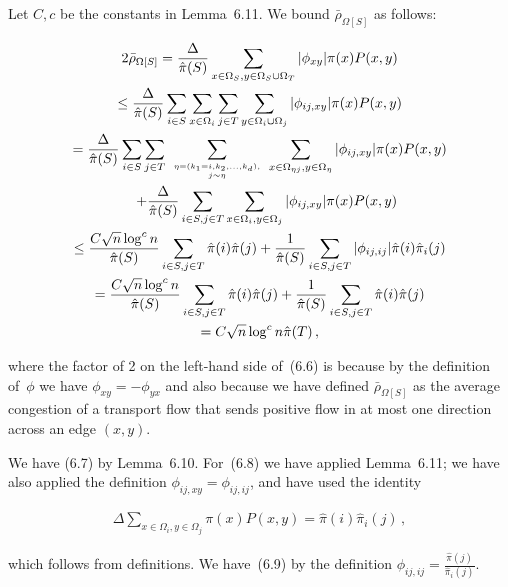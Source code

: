 Let $C,c$ be the constants in Lemma 6.11. We bound $\bar{\rho}_{\Omega[S]}$ as follows:\par




\[\begin{gathered}
\displaystyle 2\bar{\rho}_{\Omega[S]} \displaystyle=\frac{\Delta}{\hat{\pi}(S)}\sum_{x\in\Omega_{S},y\in\Omega_{S}\cup\Omega_{T}}|\phi_{xy}|\pi(x)P(x,y) \\
\displaystyle\leq\frac{\Delta}{\hat{\pi}(S)}\sum_{i\in S}\sum_{x\in\Omega_{i}}\sum_{j\in T}\sum_{y\in\Omega_{i}\cup\Omega_{j}}|\phi_{ij,xy}|\pi(x)P(x,y) \\
\displaystyle=\frac{\Delta}{\hat{\pi}(S)}\sum_{i\in S}\sum_{j\in T}~\sum_{\eta=(k_{1}=i,k_{2},\dots,k_{d}),\atop j\sim\eta}~\sum_{x\in\Omega_{\eta j},y\in\Omega_{\eta}}|\phi_{ij,xy}|\pi(x)P(x,y) \\
\displaystyle\quad+\frac{\Delta}{\hat{\pi}(S)}\sum_{i\in S,j\in T}\sum_{x\in\Omega_{i},y\in\Omega_{j}}|\phi_{ij,xy}|\pi(x)P(x,y) \\
\displaystyle\leq\frac{C\sqrt{n}\log^{c}n}{\hat{\pi}(S)}\sum_{i\in S,j\in T}\hat{\pi}(i)\hat{\pi}(j)+\frac{1}{\hat{\pi}(S)}\sum_{i\in S,j\in T}|\phi_{ij,ij}|\hat{\pi}(i)\hat{\pi}_{i}(j) \\
\displaystyle=\frac{C\sqrt{n}\log^{c}n}{\hat{\pi}(S)}\sum_{i\in S,j\in T}\hat{\pi}(i)\hat{\pi}(j)+\frac{1}{\hat{\pi}(S)}\sum_{i\in S,j\in T}\hat{\pi}(i)\hat{\pi}(j) \\
\displaystyle=C\sqrt{n}\log^{c}n\hat{\pi}(T)\,,
\end{gathered}\]


where the factor of 2 on the left-hand side of (6.6) is because by the definition of $\phi$ we have $\phi_{xy}=-\phi_{yx}$ and also because we have defined $\bar{\rho}_{\Omega[S]}$ as the average congestion of a transport flow that sends positive flow in at most one direction across an edge $(x,y)$.\par




We have (6.7) by Lemma 6.10. For (6.8) we have applied Lemma 6.11; we have also applied the definition $\phi_{ij,xy}=\phi_{ij,ij}$, and have used the identity\par


\[\begin{gathered}
\Delta\sum_{x\in\Omega_{i},y\in\Omega_{j}}\pi(x)P(x,y)=\hat{\pi}(i)\hat{\pi}_{i}(j)\,,
\end{gathered}\]


which follows from definitions. We have (6.9) by the definition $\phi_{ij,ij}=\frac{\hat{\pi}(j)}{\hat{\pi}_{i}(j)}$.\par




